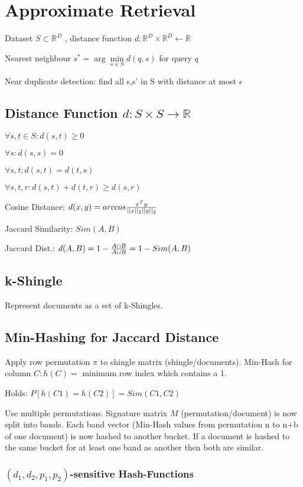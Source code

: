 \documentclass[a4paper,11pt,twocolumn]{article}
\author{Matthias Ganz}
\begin{document}
\section{Approximate Retrieval}
Dataset $S \subset \mathbb{R}^D$ , distance function $d: \mathbb{R}^D \times \mathbb{R}^D \leftarrow \mathbb{R}$

Nearest neighbour $s^* = \arg\min \limits_{s \in S} d(q,s) $ for query $q$

Near duplicate detection: find all s,s' in S with distance at most $\epsilon$

\subsection{Distance Function $d: S \times S  \rightarrow \mathbb{R}$}

$\forall s,t \in S : d(s,t) \geq 0$

$\forall s: d(s,s) = 0$

$\forall s,t:d(s,t) = d(t,s)$

$\forall s,t,r : d(s,t) + d(t,r) \geq d(s,r)$

Cosine Distance: $d(x,y) = arccos  {{x^T y}\over{ ||x||_2 ||y||_2}} $

Jaccard Similarity: $Sim(A,B)$

Jaccard Dist.: $d(A,B) = 1 - {{A \cap B}\over{A \cup B}} = 1 - Sim(A,B) $

\subsection{k-Shingle}
Represent documents as a set of k-Shingles.

\subsection{Min-Hashing for Jaccard Distance}
Apply row permutation $\pi$ to shingle matrix (shingle/documents). Min-Hash for column $C: h(C) =$ minimum row index which contains a 1.

Holds: $P[h(C1) = h(C2)] = Sim (C1,C2)$

Use multiple permutations. Signature matrix $M$ (permutation/document) is now split into bands. Each band vector (Min-Hash values from permutation n to n+b of one document) is now hashed to another bucket. If a document is hashed to the same bucket for at least one band as another then both are similar.


\subsubsection{$(d_1,d_2,p_1,p_2)$-sensitive Hash-Functions}
\end{document}
